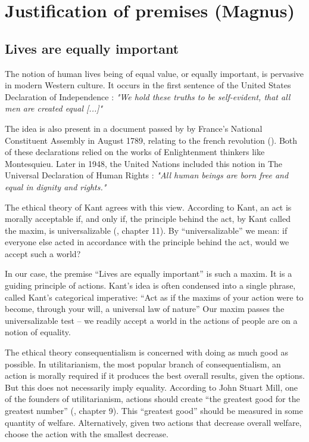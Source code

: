\section{Justification of premises (Magnus)}

\subsection{Lives are equally important}
The notion of human lives being of equal value, or equally important, is pervasive in modern Western culture. It occurs in the first sentence of the United States Declaration of Independence \cite{Declaration}: \textit{"We hold these truths to be self-evident, that all men are created equal [...]"}
 
The idea is also present in a document passed by by France's National Constituent Assembly in August 1789,  relating to the french revolution (\cite{France}). Both of these declarations relied on the works of Enlightenment thinkers like Montesquieu. Later in 1948, the United Nations included this notion in The Universal Declaration of Human Rights \cite{UN}: \textit{"All human beings are born free and equal in dignity and rights."}

The ethical theory of Kant agrees with this view. According to Kant, an act is morally acceptable if, and only if, the principle behind the act, by Kant called the maxim, is universalizable (\cite{Schafer}, chapter 11). By “universalizable” we mean: if everyone else acted in accordance with the principle behind the act, would we accept such a world?  

In our case, the premise “Lives are equally important” is such a maxim. It is a guiding principle of actions. Kant’s idea is often condensed into a single phrase, called Kant’s categorical imperative: “Act as if the maxims of your action were to become, through your will, a universal law of nature” Our maxim passes the universalizable test – we readily accept a world in the actions of people are on a notion of equality.

The ethical theory consequentialism is concerned with doing as much good as possible.
In utilitarianism, the most popular branch of consequentialism, an action is morally required if it produces the best overall results, given the options. But this does not necessarily imply equality. According to John Stuart Mill, one of the founders of utilitarianism, actions should create “the greatest good for the greatest number” (\cite{Schafer}, chapter 9). This “greatest good” should be measured in some quantity of welfare. Alternatively, given two actions that decrease overall welfare, choose the action with the smallest decrease.

